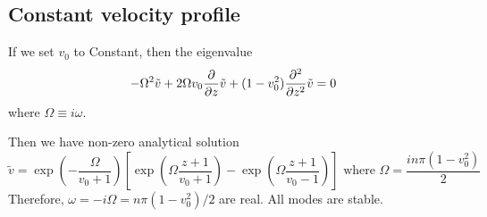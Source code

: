 \documentclass{article}
\theoremstyle{plain}
\theoremstyle{definition}
\theoremstyle{remark}
\theoremstyle{remark}
\begin{document}
\subsection{Constant velocity profile}
If we set $v_0$ to Constant, then the eigenvalue 
\begin{equation}
    -\Omega^2 \tilde{v} 
    + 2\Omega v_0\pdv{}{z} \tilde{v} 
    + (1-v_0^2)\pdv[2]{}{z} \tilde{v}
    = 0
    \label{eq:constant-v-problem}
\end{equation}
where $\Omega\equiv i\omega$.

Then we have non-zero analytical solution 
\begin{equation}
    \tilde{v} = \exp(-\frac{\Omega}{v_0+1})\left[ \exp(\Omega\frac{z+1}{v_0+1}) - \exp(\Omega\frac{z+1}{v_0-1}) \right] \text{ where } \Omega=\frac{in\pi(1-v_0^2)}{2}
\end{equation}
Therefore, $\omega = -i\Omega = n\pi(1-v_0^2)/2$ are real. All modes are stable.
\end{document}
